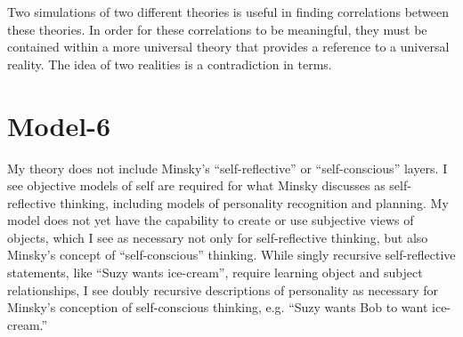 Two simulations of two different theories is useful in finding
correlations between these theories.  In order for these correlations
to be meaningful, they must be contained within a more universal
theory that provides a reference to a universal reality.  The idea of
two realities is a contradiction in terms.


\section{Model-6}

My theory does not include Minsky's ``self-reflective'' or
``self-conscious'' layers.  I see objective models of self are
required for what Minsky discusses as self-reflective thinking,
including models of personality recognition and planning.  My model
does not yet have the capability to create or use subjective views of
objects, which I see as necessary not only for self-reflective
thinking, but also Minsky's concept of ``self-conscious'' thinking.
While singly recursive self-reflective statements, like ``Suzy wants
ice-cream'', require learning object and subject relationships, I see
doubly recursive descriptions of personality as necessary for Minsky's
conception of self-conscious thinking, e.g. ``Suzy wants Bob to want
ice-cream.''

